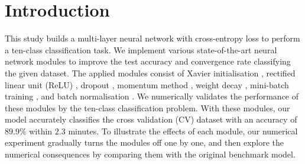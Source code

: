 \section{Introduction\label{chapter1}}

This study builds a multi-layer neural network with cross-entropy loss to perform a ten-class classification task. We implement various state-of-the-art neural network modules to improve the test  accuracy  and convergence rate classifying the given dataset.
The applied modules consist of Xavier initialisation \citep{pmlr-v9-glorot10a}, 
rectified linear unit (ReLU) \citep{relu-hahnloser}, 
dropout \citep{DBLP:journals/corr/abs-1207-0580},
momentum method \citep{rumelhart1986learning},
weight decay \citep{NIPS1991563}, 
mini-batch training \citep{DBLP:journals/corr/GoyalDGNWKTJH17}, 
and batch normalisation \citep{pmlr-v37-ioffe15}.
We numerically validates the performance of these modules by the ten-class classification problem. 
With these modules, our model accurately classifies the cross validation (CV) dataset with an accuracy of $89.9\%$ within $2.3$ minutes. 
To illustrate the effects of each module, our numerical experiment gradually turns the modules off one by one, and then explore the numerical consequences by comparing them with the original benchmark model.

